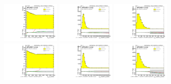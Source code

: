 \begin{figure}[htbp!]
\begin{center}
\includegraphics[width=0.25\textwidth,angle=-90]{figures/boosted/Reweight/Fits/Moriond_bkg_3_NoTag_3Trk_subl_Incl_leadHCand_Pt_m_1.pdf}
\includegraphics[width=0.25\textwidth,angle=-90]{figures/boosted/Reweight/Fits/Moriond_bkg_3_NoTag_3Trk_subl_Incl_leadHCand_trk0_Pt.pdf}
\includegraphics[width=0.25\textwidth,angle=-90]{figures/boosted/Reweight/Fits/Moriond_bkg_3_NoTag_3Trk_subl_Incl_leadHCand_trk1_Pt.pdf} \\
\includegraphics[width=0.25\textwidth,angle=-90]{figures/boosted/Reweight/Fits/Moriond_bkg_9_NoTag_3Trk_subl_Incl_leadHCand_Pt_m_1.pdf}
\includegraphics[width=0.25\textwidth,angle=-90]{figures/boosted/Reweight/Fits/Moriond_bkg_9_NoTag_3Trk_subl_Incl_leadHCand_trk0_Pt.pdf}
\includegraphics[width=0.25\textwidth,angle=-90]{figures/boosted/Reweight/Fits/Moriond_bkg_9_NoTag_3Trk_subl_Incl_leadHCand_trk1_Pt.pdf} \\

\end{center}
\end{figure}

